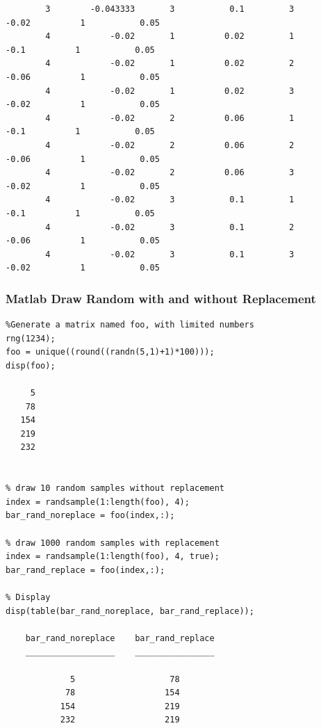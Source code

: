 \documentclass[
]{book}
\begin{document}
\begin{verbatim}
        3        -0.043333       3           0.1         3          -0.02          1           0.05   
        4            -0.02       1          0.02         1           -0.1          1           0.05   
        4            -0.02       1          0.02         2          -0.06          1           0.05   
        4            -0.02       1          0.02         3          -0.02          1           0.05   
        4            -0.02       2          0.06         1           -0.1          1           0.05   
        4            -0.02       2          0.06         2          -0.06          1           0.05   
        4            -0.02       2          0.06         3          -0.02          1           0.05   
        4            -0.02       3           0.1         1           -0.1          1           0.05   
        4            -0.02       3           0.1         2          -0.06          1           0.05   
        4            -0.02       3           0.1         3          -0.02          1           0.05   
\end{verbatim}

\hypertarget{matlab-draw-random-with-and-without-replacement}{%
\subsubsection{Matlab Draw Random with and without Replacement}\label{matlab-draw-random-with-and-without-replacement}}

\begin{verbatim}
%Generate a matrix named foo, with limited numbers
rng(1234);
foo = unique((round((randn(5,1)+1)*100)));
disp(foo);

     5
    78
   154
   219
   232


% draw 10 random samples without replacement
index = randsample(1:length(foo), 4);
bar_rand_noreplace = foo(index,:);

% draw 1000 random samples with replacement
index = randsample(1:length(foo), 4, true);
bar_rand_replace = foo(index,:);

% Display
disp(table(bar_rand_noreplace, bar_rand_replace));

    bar_rand_noreplace    bar_rand_replace
    __________________    ________________

             5                   78       
            78                  154       
           154                  219       
           232                  219       
\end{verbatim}
\end{document}
